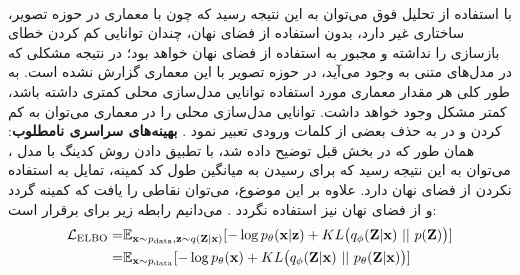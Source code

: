 \\
با استفاده از تحلیل فوق می‌توان به این نتیجه رسید که چون \vae{} با معماری 
 در حوزه تصویر، ساختاری  غیر \autoregressive{} دارد، بدون استفاده از فضای نهان، چندان توانایی کم کردن خطای بازسازی را نداشته و مجبور به استفاده از فضای نهان خواهد بود؛ در نتیجه مشکلی که در مدل‌های متنی به وجود می‌آید، در حوزه تصویر با این معماری گزارش نشده است. به طور کلی هر مقدار معماری مورد استفاده توانایی مدل‌سازی محلی کمتری داشته باشد، کمتر مشکل وجود خواهد داشت. توانایی مدل‌سازی محلی را در معماری \cnn{} می‌توان به کم کردن \receiptivefield{} و در \lstm{} به حذف بعضی از کلمات ورودی تعبیر نمود \cite{vae_lossy, vae_dialated, vae_hybrid}.
\vspace{.3cm}
\newline
\textbf{بهینه‌های سراسری نامطلوب}: 
همان ‌طور که در بخش قبل توضیح داده شد، با تطبیق دادن روش کدینگ   با مدل \vae{}، می‌توان به این نتیجه رسید که \decoder{} برای رسیدن به میانگین طول کد کمینه، تمایل به استفاده نکردن از فضای نهان دارد. علاوه بر این موضوع، می‌توان نقاطی را یافت که  کمینه گردد و از فضای نهان نیز استفاده نگردد \cite{infovae}. می‌دانیم رابطه زیر برای  برقرار است:
\begin{align}
	\mathcal{L}_{\text{ELBO}} = & \mathbb E_{{\bf x} \sim p_\text{data}, {\bf z} \sim q({\bf Z}|{\bf x})} [- \log p_\theta({\bf x}|{\bf z}) + KL\big(q_\phi({\bf Z}|{\bf x}) ~ || ~ p({\bf Z})\big)] \nonumber
	\\
	=                           & \mathbb E_{{\bf x} \sim p_\text{data}} [-\log p_\theta({\bf x}) + KL\big(q_\phi({\bf Z}|{\bf x}) ~||~ p_\theta({\bf Z}|{\bf x})\big)] \nonumber
\end{align}

